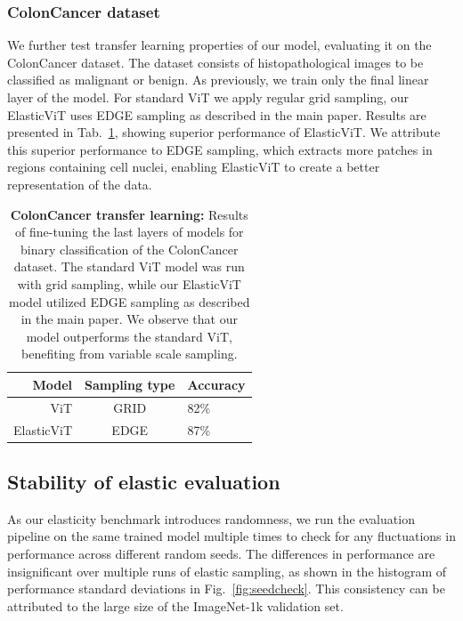 \documentclass[10pt,twocolumn,letterpaper]{article}
\begin{document}


\subsubsection{ColonCancer dataset}

We further test transfer learning properties of our model, evaluating it on the ColonCancer dataset. The dataset consists of histopathological images to be classified as malignant or benign. As previously, we train only the final linear layer of the model. For standard ViT we apply regular grid sampling, our ElasticViT uses EDGE sampling as described in the main paper. Results are presented in Tab.~\ref{tab:cc}, showing superior performance of ElasticViT. We attribute this superior performance to EDGE sampling, which extracts more patches in regions containing cell nuclei, enabling ElasticViT to create a better representation of the data.

\begin{table}[t]
    \centering
    \begin{tabular}{rcl}
    \toprule
        Model & Sampling type & Accuracy \\
        \midrule
        ViT & GRID & 82\% \\
        ElasticViT & EDGE & 87\% \\
        \bottomrule
    \end{tabular}
    \caption{\textbf{ColonCancer transfer learning:} Results of fine-tuning the last layers of models for binary classification of the ColonCancer dataset. The standard ViT model was run with grid sampling, while our ElasticViT model utilized EDGE sampling as described in the main paper. We observe that our model outperforms the standard ViT, benefiting from variable scale sampling.}
    \label{tab:cc}
\end{table}

\subsection{Stability of elastic evaluation}
As our elasticity benchmark introduces randomness, we run the evaluation pipeline on the same trained model multiple times to check for any fluctuations in performance across different random seeds. The differences in performance are insignificant over multiple runs of elastic sampling, as shown in the histogram of performance standard deviations in Fig.~\ref{fig:seedcheck}. This consistency can be attributed to the large size of the ImageNet-1k validation set.
\end{document}
